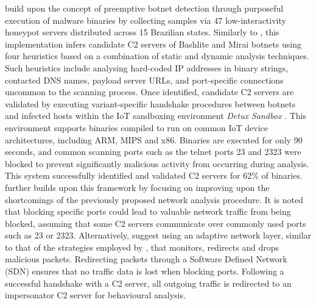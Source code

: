 \citet{Bastos2019} build upon the concept of preemptive botnet detection through purposeful execution of malware binaries by collecting samples via 47 low-interactivity honeypot servers distributed across 15 Brazilian states. Similarly to \citet{Moon2012}, this implementation infers candidate C2 servers of Bashlite and Mirai botnets using four heuristics based on a combination of static and dynamic analysis techniques. Such heuristics include analysing hard-coded IP addresses in binary strings, contacted DNS names, payload server URLs, and port-specific connections uncommon to the scanning process. Once identified, candidate C2 servers are validated by executing variant-specific handshake procedures between botnets and infected hosts within the IoT sandboxing environment \textit{Detux Sandbox} \citep{Detux2016}. This environment supports binaries compiled to run on common IoT device architectures, including ARM, MIPS and x86. Binaries are executed for only 90 seconds, and common scanning ports such as the telnet ports 23 and 2323 were blocked to prevent significantly malicious activity from occurring during analysis. This system successfully identified and validated C2 servers for 62\% of binaries. \citet{Ceron2019} further builds upon this framework by focusing on improving upon the shortcomings of the previously proposed network analysis procedure. It is noted that blocking specific ports could lead to valuable network traffic from being blocked, assuming that some C2 servers communicate over commonly used ports such as 23 or 2323. Alternatively, \citet{Ceron2019} suggest using an adaptive network layer, similar to that of the strategies employed by \citet{PaPa2016}, that monitors, redirects and drops malicious packets. Redirecting packets through a Software Defined Network (SDN) ensures that no traffic data is lost when blocking ports. Following a successful handshake with a C2 server, all outgoing traffic is redirected to an impersonator C2 server for behavioural analysis.

